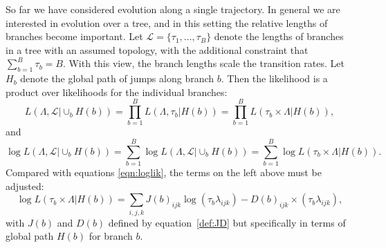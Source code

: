 \documentclass[11pt]{article}
\begin{document}
So far we have considered evolution along a single trajectory. In
general we are interested in evolution over a tree, and in this
setting the relative lengths of branches become important.  Let
$\mathcal{L} = \{\tau_1,\ldots,\tau_B\}$ denote the lengths of
branches in a tree with an assumed topology, with the additional
constraint that $\sum_{b=1}^B\tau_b = B$. With this view, the branch
lengths scale the transition rates. Let $H_b$ denote the global path
of jumps along branch $b$. Then the likelihood is a product over
likelihoods for the individual branches:
\begin{equation}\label{eqn:liknew}
  L(\Lambda, \mathcal{L} | \cup_{b} H(b)) = \prod_{b=1}^B L(\Lambda, \tau_b | H(b)) = \prod_{b=1}^B L(\tau_b \times \Lambda | H(b)),
\end{equation}
and
\begin{equation}\label{eqn:logliknew}
  \log L(\Lambda, \mathcal{L} | \cup_b H(b)) = \sum_{b=1}^B \log L(\Lambda, \mathcal{L} | \cup_b H(b)) = \sum_{b=1}^B \log L(\tau_b \times \Lambda | H(b)).
\end{equation}
Compared with equations \eqref{eqn:loglik}, the terms on the left above
must be adjusted:
\begin{equation}\label{eqn:loglik1new}
  \log L(\tau_b \times \Lambda | H(b)) = \sum_{i,j,k} J(b)_{ijk}\log(\tau_b\lambda_{ijk}) - D(b)_{ijk}\times(\tau_b\lambda_{ijk}),
\end{equation}
with $J(b)$ and $D(b)$ defined by equation~\eqref{def:JD} but
specifically in terms of global path $H(b)$ for branch $b$.
\end{document}
